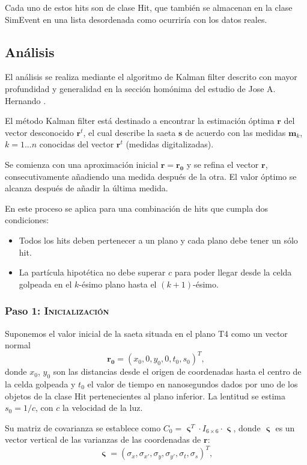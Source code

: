 \documentclass[a4paper]{article}
\let\vec\mathbf  %
\begin{document}
Cada uno de estos hits son de clase Hit, que también se almacenan en la clase SimEvent en una lista desordenada como ocurriría con los datos reales.


\subsection{Análisis}


El análisis se realiza mediante el algoritmo de Kalman filter descrito con mayor profundidad y generalidad en la sección homónima del estudio de Jose A. Hernando \cite{joaneh}.

El método Kalman filter está destinado a encontrar la estimación óptima $\vec{r}$ del vector desconocido $\vec{r}^t$, el cual describe la saeta $\vec{s}$ de acuerdo con las medidas $\vec{m}_k$, $k = 1 ... n$ conocidas del vector $\vec{r}^t$ (medidas digitalizadas).

Se comienza con una aproximación inicial $\vec{r} = \vec{r_0}$ y se refina el vector $\vec{r}$, consecutivamente añadiendo una medida después de la otra. El valor óptimo se alcanza después de añadir la última medida.

En este proceso se aplica para una combinación de hits que cumpla dos condiciones:
\begin{itemize}
    \item Todos los hits deben pertenecer a un plano y cada plano debe tener un sólo hit.
    \item La partícula hipotética no debe superar $c$ para poder llegar desde la celda golpeada en el $k$-ésimo plano hasta el $(k + 1)$-ésimo.
\end{itemize}

\subsubsection{Paso 1: \textsc{Inicialización}}

Suponemos el valor inicial de la saeta situada en el plano T4 como un vector normal
\begin{equation}
    \vec{r_0} = (x_0, 0, y_0, 0, t_0, s_0)^T,
    \label{eq:init}
\end{equation}
donde $x_0$, $y_0$ son las distancias desde el origen de coordenadas hasta el centro de la celda golpeada y $t_0$ el valor de tiempo en nanosegundos dados por uno de los objetos de la clase Hit pertenecientes al plano inferior. La lentitud se estima $s_0 = 1/c$, con $c$ la velocidad de la luz.

Su matriz de covarianza se establece como $C_0 = \vec{\upvarsigma}^T \cdot I_{6 \times 6} \cdot \vec{\upvarsigma}$, donde $\vec{\upvarsigma}$ es un vector vertical de las varianzas de las coordenadas de $\vec{r}$:
\begin{equation}
    \vec{\upvarsigma} = (\sigma_x, \sigma_{x'}, \sigma_y, \sigma_{y'}, \sigma_t, \sigma_s)^T,
    \label{eq:sigmas}
\end{equation}
\end{document}
